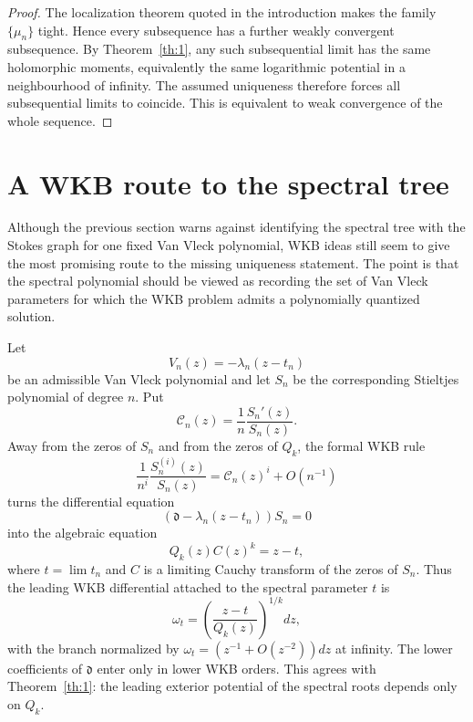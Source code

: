 \documentclass[10pt,twoside,a4paper,reqno]{amsart}
\theoremstyle{plain}
\theoremstyle{definition}
\theoremstyle{remark}
\newcommand {\dq}{\mathfrak d}
\begin{document}
\begin{proof}
The localization theorem quoted in the introduction makes the family $\{\mu_n\}$ tight.  Hence every subsequence has a further weakly convergent subsequence.  By Theorem~\ref{th:1}, any such subsequential limit has the same holomorphic moments, equivalently the same logarithmic potential in a neighbourhood of infinity.  The assumed uniqueness therefore forces all subsequential limits to coincide.  This is equivalent to weak convergence of the whole sequence.
\end{proof}

\section{A WKB route to the spectral tree}
\label{sec:wkb}

Although the previous section warns against identifying the spectral tree with the Stokes graph for one fixed Van Vleck polynomial, WKB ideas still seem to give the most promising route to the missing uniqueness statement.  The point is that the spectral polynomial should be viewed as recording the set of Van Vleck parameters for which the WKB problem admits a polynomially quantized solution.

Let
\[
        V_n(z)=-\lambda_n(z-t_n)
\]
be an admissible Van Vleck polynomial and let $S_n$ be the corresponding Stieltjes polynomial of degree $n$.  Put
\[
        \mathcal C_n(z)=\frac1n\frac{S_n'(z)}{S_n(z)}.
\]
Away from the zeros of $S_n$ and from the zeros of $Q_k$, the formal WKB rule
\[
        \frac{1}{n^i}\frac{S_n^{(i)}(z)}{S_n(z)}=\mathcal C_n(z)^i+O(n^{-1})
\]
turns the differential equation
\[
        (\dq-\lambda_n(z-t_n))S_n=0
\]
into the algebraic equation
\begin{equation}
\label{eq:wkb-cauchy}
        Q_k(z)C(z)^k=z-t,
\end{equation}
where $t=\lim t_n$ and $C$ is a limiting Cauchy transform of the zeros of $S_n$.  Thus the leading WKB differential attached to the spectral parameter $t$ is
\begin{equation}
\label{eq:wkb-differential}
        \omega_t=\left(\frac{z-t}{Q_k(z)}\right)^{1/k}dz,
\end{equation}
with the branch normalized by $\omega_t=(z^{-1}+O(z^{-2}))dz$ at infinity.  The lower coefficients of $\dq$ enter only in lower WKB orders.  This agrees with Theorem~\ref{th:1}: the leading exterior potential of the spectral roots depends only on $Q_k$.
\end{document}
